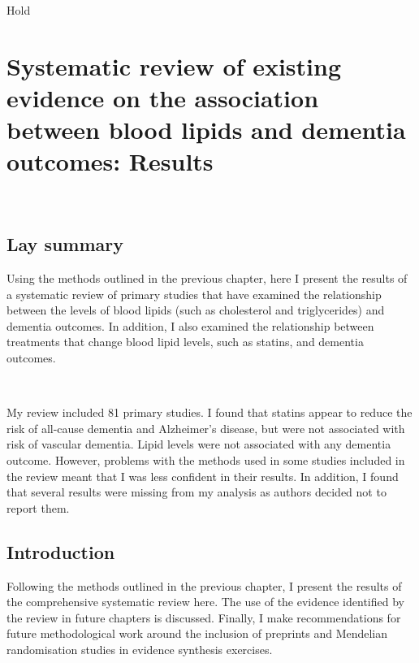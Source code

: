 \documentclass[a4paper, twoside]{templates/ociamthesis}
\begin{document}
\begin{savequote}
Hold
\end{savequote}



\hypertarget{sys-rev-results-heading}{%
\chapter{Systematic review of existing evidence on the association between blood lipids and dementia outcomes: Results}\label{sys-rev-results-heading}}

~

\minitoc 

\begin{laybox}

\hypertarget{lay-summary-3}{%
\section*{Lay summary}\label{lay-summary-3}}

Using the methods outlined in the previous chapter, here I present the results of a systematic review of primary studies that have examined the relationship between the levels of blood lipids (such as cholesterol and triglycerides) and dementia outcomes. In addition, I also examined the relationship between treatments that change blood lipid levels, such as statins, and dementia outcomes.

~

My review included 81 primary studies. I found that statins appear to reduce the risk of all-cause dementia and Alzheimer's disease, but were not associated with risk of vascular dementia. Lipid levels were not associated with any dementia outcome. However, problems with the methods used in some studies included in the review meant that I was less confident in their results. In addition, I found that several results were missing from my analysis as authors decided not to report them.

\end{laybox}

\hypertarget{introduction-1}{%
\section{Introduction}\label{introduction-1}}

Following the methods outlined in the previous chapter, I present the results of the comprehensive systematic review here. The use of the evidence identified by the review in future chapters is discussed. Finally, I make recommendations for future methodological work around the inclusion of preprints and Mendelian randomisation studies in evidence synthesis exercises.
\end{document}
